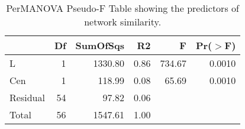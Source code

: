 \begin{table}[ht]
\centering
\begin{tabular}{lrrrrr}
  \hline
 & Df & SumOfSqs & R2 & F & Pr($>$F) \\ 
  \hline
L & 1 & 1330.80 & 0.86 & 734.67 & 0.0010 \\ 
  Cen & 1 & 118.99 & 0.08 & 65.69 & 0.0010 \\ 
  Residual & 54 & 97.82 & 0.06 &  &  \\ 
  Total & 56 & 1547.61 & 1.00 &  &  \\ 
   \hline
\end{tabular}
\caption{PerMANOVA Pseudo-F Table showing the predictors of network similarity.} 
\label{tab:cn_L_cen_perm}
\end{table}
